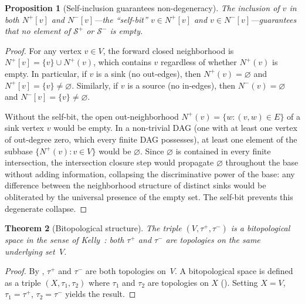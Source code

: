 \documentclass[11pt,a4paper]{article}
\theoremstyle{plain}
\newtheorem{theorem}{Theorem}[section]
\newtheorem{proposition}[theorem]{Proposition}
\theoremstyle{definition}
\newcommand{\Nfwd}[1]{N^{+}[#1]}
\newcommand{\Nbwd}[1]{N^{-}[#1]}
\newcommand{\taufwd}{\tau^{+}}
\newcommand{\taubwd}{\tau^{-}}
\newcommand{\subbase}{\mathcal{S}}
\begin{document}
\begin{proposition}[Self-inclusion guarantees non-degeneracy]%
\label{prop:self-inclusion}
The inclusion of $v$ in both $\Nfwd{v}$ and $\Nbwd{v}$---the ``self-bit''
$v \in \Nfwd{v}$ and $v \in \Nbwd{v}$---guarantees that no element of
$\subbase^{+}$ or $\subbase^{-}$ is empty.
\end{proposition}

\begin{proof}
For any vertex $v \in V$, the forward closed neighborhood is
$\Nfwd{v} = \{v\} \cup N^{+}(v)$, which contains $v$ regardless of whether
$N^{+}(v)$ is empty.  In particular, if $v$ is a sink (no out-edges), then
$N^{+}(v) = \varnothing$ and $\Nfwd{v} = \{v\} \neq \varnothing$.  Similarly,
if $v$ is a source (no in-edges), then $N^{-}(v) = \varnothing$ and
$\Nbwd{v} = \{v\} \neq \varnothing$.

Without the self-bit, the open out-neighborhood
$N^{+}(v) = \{w : (v,w) \in E\}$ of a sink vertex $v$ would be empty.  In a
non-trivial DAG (one with at least one vertex of out-degree zero, which every
finite DAG possesses), at least one element of the subbase $\{N^{+}(v) : v \in V\}$
would be $\varnothing$.  Since $\varnothing$ is contained in every finite
intersection, the intersection closure step would propagate $\varnothing$
throughout the base without adding information, collapsing the discriminative
power of the base: any difference between the neighborhood structure of
distinct sinks would be obliterated by the universal presence of the empty
set.  The self-bit prevents this degenerate collapse.
\end{proof}


\begin{theorem}[Bitopological structure]%
\label{thm:bitopological-structure}
The triple $(V, \taufwd, \taubwd)$ is a bitopological space in the sense of
Kelly~\cite{Kelly1963}: both $\taufwd$ and $\taubwd$ are topologies on the
same underlying set~$V$.
\end{theorem}

\begin{proof}
By , $\taufwd$ and $\taubwd$ are both topologies
on~$V$.  A bitopological space is defined as a triple $(X, \tau_1, \tau_2)$
where $\tau_1$ and $\tau_2$ are topologies on $X$
().  Setting $X = V$, $\tau_1 = \taufwd$,
$\tau_2 = \taubwd$ yields the result.
\end{proof}
\end{document}
